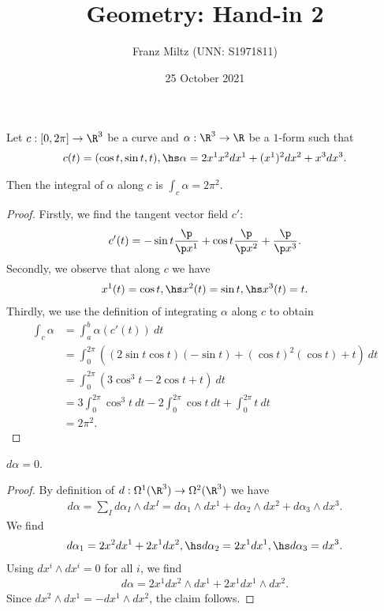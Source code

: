 \documentclass{article}
\begin{document}
\title{Geometry: Hand-in 2}
\author{Franz Miltz (UNN: S1971811)}
\date{25 October 2021}
\maketitle
\noindent Let $c:[0,2\pi] \to \R^3$ be a curve and $\alpha:\R^3\to\R$ be a $1$-form
such that 
\begin{align*}
   c(t)   = (\cos t, \sin t, t), \hs
   \alpha = 2x^1x^2dx^1 + (x^1)^2dx^2 + x^3dx^3.
\end{align*}

\begin{claim*}
   Then the integral of $\alpha$ along $c$ is $\int_c \alpha = 2\pi^2$.
\end{claim*}
\begin{proof}
   Firstly, we find the tangent vector field $c'$:
   \begin{align*}
      c'(t) = -\sin t\frac{\p }{\p x^1} + \cos t\frac{\p }{\p x^2} + \frac{\p }{\p x^3} .
   \end{align*}
   Secondly, we observe that along $c$ we have 
   \begin{align*}
      x^1(t) = \cos t, \hs x^2(t)= \sin t, \hs x^3(t) = t.
   \end{align*}
   Thirdly, we use the definition of integrating $\alpha$ along $c$ to obtain
   \begin{align*}
      \int_c \alpha &= \int_a^b \alpha(c'(t))\:dt\\
      &= \int_0^{2\pi}\left( (2\sin t\cos t)(-\sin t) + (\cos t)^2 (\cos t) + t\right)\:dt\\
      &= \int_0^{2\pi} \left(3\cos^3 t - 2 \cos t + t\right)\:dt\\
      &= 3\int_0^{2\pi} \cos^3 t\:dt - 2 \int_0^{2\pi} \cos t\: dt + \int_0^{2\pi} t\:dt\\
      &= 2\pi^2.
   \end{align*}
\end{proof}

\begin{claim*}
   $d\alpha = 0$.
\end{claim*}
\begin{proof}
   By definition of $d:\Omega^1(\R^3) \to\Omega^2(\R^3)$ we have
   \begin{align*}
      d\alpha =\sum_I d\alpha_I\wedge dx^I
      = d\alpha_1\wedge dx^1 + d\alpha_2\wedge dx^2 + d\alpha_3\wedge dx^3.
   \end{align*}
   We find 
   \begin{align*}
      d\alpha_1 = 2x^2dx^1 + 2x^1dx^2, \hs 
      d\alpha_2 = 2x^1dx^1, \hs
      d\alpha_3 = dx^3.
   \end{align*}
   Using $dx^i\wedge dx^i=0$ for all $i$, we find
   \begin{align*}
      d\alpha = 2x^1dx^2\wedge dx^1 + 2x^1dx^1\wedge dx^2.
   \end{align*}
   Since $dx^2\wedge dx^1=-dx^1\wedge dx^2$, the claim follows.
\end{proof}
\end{document}
